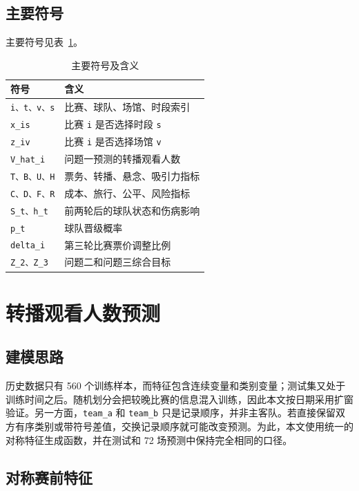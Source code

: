 \subsection{主要符号}

主要符号见表~\ref{tab:symbols}。

\begin{longtable}[]{@{}ll@{}}
\caption{主要符号及含义}\label{tab:symbols}\\
\toprule\noalign{}
符号 & 含义 \\
\midrule\noalign{}
\endhead
\bottomrule\noalign{}
\endlastfoot
\texttt{i、t、v、s} & 比赛、球队、场馆、时段索引 \\
\texttt{x\_is} & 比赛 \texttt{i} 是否选择时段 \texttt{s} \\
\texttt{z\_iv} & 比赛 \texttt{i} 是否选择场馆 \texttt{v} \\
\texttt{V\_hat\_i} & 问题一预测的转播观看人数 \\
\texttt{T、B、U、H} & 票务、转播、悬念、吸引力指标 \\
\texttt{C、D、F、R} & 成本、旅行、公平、风险指标 \\
\texttt{S\_t、h\_t} & 前两轮后的球队状态和伤病影响 \\
\texttt{p\_t} & 球队晋级概率 \\
\texttt{delta\_i} & 第三轮比赛票价调整比例 \\
\texttt{Z\_2、Z\_3} & 问题二和问题三综合目标 \\
\end{longtable}

\section{转播观看人数预测}

\subsection{建模思路}

历史数据只有 560 个训练样本，而特征包含连续变量和类别变量；测试集又处于训练时间之后。随机划分会把较晚比赛的信息混入训练，因此本文按日期采用扩窗验证。另一方面，\texttt{team\_a} 和 \texttt{team\_b} 只是记录顺序，并非主客队。若直接保留双方有序类别或带符号差值，交换记录顺序就可能改变预测。为此，本文使用统一的对称特征生成函数，并在测试和 72 场预测中保持完全相同的口径。

\subsection{对称赛前特征}

